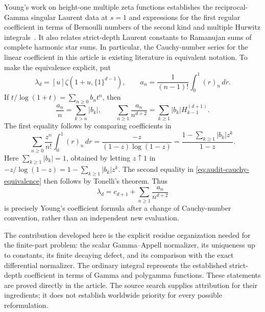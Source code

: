 Young's work on height-one multiple zeta functions establishes
the reciprocal-Gamma singular Laurent data at $s=1$ and
expressions for the first regular coefficient in terms of
Bernoulli numbers of the second kind and multiple Hurwitz
integrals~\cite{Young2023,Young2024,YoungLecture}.  It also relates
strict-depth Laurent constants to Ramanujan sums of complete
harmonic star sums.  In particular, the Cauchy-number series
for the linear coefficient in this article is existing
literature in equivalent notation.  To make the equivalence
explicit, put
\begin{equation}
 \lambda_d=[u]\zeta(1+u,\{1\}^{d-1}),\qquad
 a_n=\frac{1}{(n-1)!}\int_0^1(r)_n\,dr.
 \label{eq:audit-lambda-and-cauchy}
\end{equation}
If $t/\log(1+t)=\sum_{n\geq0}b_nt^n$, then
\begin{equation}
 \frac{a_n}{n}=\sum_{k>n}|b_k|,\qquad
 \sum_{n\geq1}\frac{a_n}{n^{d+2}}
      =\sum_{k\geq1}|b_k|H_{k-1}^{(d+1)}.
 \label{eq:audit-cauchy-equivalence}
\end{equation}
The first equality follows by comparing coefficients in
\begin{equation}
 \sum_{n\geq0}\frac{z^n}{n!}\int_0^1(r)_n\,dr
   =\frac{-z}{(1-z)\log(1-z)}
   =\frac{1-\sum_{k\geq1}|b_k|z^k}{1-z}.
 \label{eq:audit-cauchy-generating-equivalence}
\end{equation}
Here $\sum_{k\geq1}|b_k|=1$, obtained by letting $z\uparrow1$
in $-z/\log(1-z)=1-\sum_{k\geq1}|b_k|z^k$.
The second equality in \eqref{eq:audit-cauchy-equivalence}
then follows by Tonelli's theorem.  Thus
\begin{equation}
 \lambda_d=c_{d+1}+\sum_{n\geq1}\frac{a_n}{n^{d+2}}
 \label{eq:audit-known-cauchy-coefficient}
\end{equation}
is precisely Young's coefficient formula after a change of
Cauchy-number convention, rather than an independent new evaluation.

The contribution developed here is the explicit residue organization
needed for the finite-part problem: the scalar Gamma--Appell
normalizer, its uniqueness up to constants, its finite decaying
defect, and its comparison with the exact differential normalizer.
The ordinary integral represents the established strict-depth
coefficient in terms of Gamma and polygamma functions.
These statements are proved directly in the article.  The source
search supplies attribution for their ingredients; it does not
establish worldwide priority for every possible reformulation.

